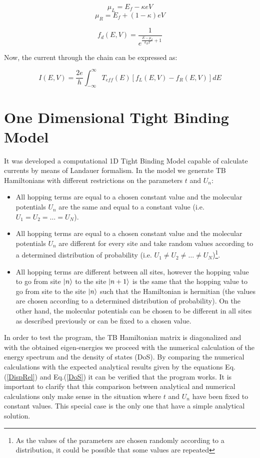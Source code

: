 \documentclass[12pt]{article}
\begin{document}
$$
	\mu_{L} = E_{f} - \kappa eV
$$
$$
	\mu_{R} = E_{f} + (1 - \kappa) eV
$$

\begin{equation}\label{Fermifunc}
	f_{d}(E, V)= \frac{1}{e^{\frac{E-\mu_{d}}{k_{B}T}+1}}
\end{equation}

Now, the current through the chain can be expressed as:

\begin{equation}\label{Current}
	I(E, V) = \frac{2e}{h}\int_{-\infty}^{\infty} T_{eff}(E)[f_{L}(E, V)-f_{R}(E, V)] dE
\end{equation}


\clearpage
\newpage
\section{One Dimensional Tight Binding Model}
It was developed a computational 1D Tight Binding Model capable of calculate currents by means of Landauer formalism. In the model we generate TB Hamiltonians with different restrictions on the parameters $t$ and $U_{n}$: 

\begin{itemize}
	\item All hopping terms are equal to a chosen constant value and the molecular potentials $U_{n}$ are the same and equal to a constant value (i.e. $U_{1} =  U_{2} = \hdots = U_{N}$).

	\item All hopping terms are equal to a chosen constant value and the molecular potentials $U_{n}$ are different for every site and take random values according to a determined distribution of probability (i.e. $U_{1}\neq U_{2}\neq \hdots \neq U_{N}$)\footnote{As the values of the parameters are chosen randomly according to a distribution, it could be possible that some values are repeated}.

     \item All hopping terms are different between all sites, however the hopping value to go from site $\ket{n}$ to the site $\ket{n+1}$ is the same that the hopping value to go from site to the site $\ket{n}$ such that the Hamiltonian is hermitian (the values are chosen according to a determined distribution of probability). On the other hand, the molecular potentials can be chosen to be different in all sites as described previously or can be fixed to a chosen value.    
\end{itemize}


In order to test the program, the TB Hamiltonian matrix is diagonalized and with the obtained eigen-energies we proceed with the numerical calculation of the energy spectrum and the density of states (DoS). By comparing the numerical calculations with the expected analytical results given by the equations Eq.(\ref{DispRel}) and Eq.(\ref{DoS}) it can be verified that the program works. It is important to clarify that this comparison between analytical and numerical calculations only make sense in the situation where $t$ and $U_{n}$ have been fixed to constant values. This special case is the only one that have a simple analytical solution. 
\end{document}

